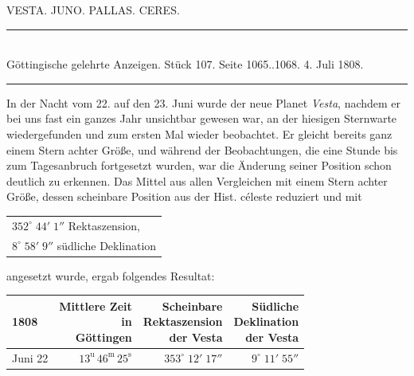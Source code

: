 \begin{center}
VESTA. JUNO. PALLAS. CERES.
\end{center}

\begin{center}
\rule{4cm}{0.4pt}\\
\fontsize{10}{12}\selectfont Göttingische gelehrte Anzeigen. Stück 107. Seite 1065..1068. 4. Juli 1808.\\
\rule{4cm}{0.4pt}
\end{center}

In der Nacht vom 22. auf den 23. Juni wurde der neue Planet \emph{Vesta}, nachdem er bei uns fast ein ganzes Jahr unsichtbar gewesen war, an der hiesigen Sternwarte wiedergefunden und zum ersten Mal wieder beobachtet. Er gleicht bereits ganz einem Stern achter Größe, und während der Beobachtungen, die eine Stunde bis zum Tagesanbruch fortgesetzt wurden, war die Änderung seiner Position schon deutlich zu erkennen. Das Mittel aus allen Vergleichen mit einem Stern achter Größe, dessen scheinbare Position aus der Hist. céleste reduziert und mit


\begin{center}\fontsize{10}{12}\selectfont\setlength{\tabcolsep}{3pt}\renewcommand{\arraystretch}{1.15}\begin{tabular}{l}
$352^\circ\;44'\;1''$ Rektaszension,\\
$8^\circ\;58'\;9''$ südliche Deklination
\end{tabular}\end{center}


\noindent angesetzt wurde, ergab folgendes Resultat:


\begin{center}\fontsize{10}{12}\selectfont\setlength{\tabcolsep}{3pt}\renewcommand{\arraystretch}{1.15}\begin{tabular}{lrrr}
1808 & \shortstack{Mittlere Zeit\\in\\Göttingen} & \shortstack{Scheinbare\\Rektaszension\\der Vesta} & \shortstack{Südliche\\Deklination\\der Vesta}\\\hline
Juni 22 & $13^{\text{u}}\,46^{\text{m}}\,25^{\text{s}}$ & $353^\circ\;12'\;17''$ & $9^\circ\;11'\;55''$\\
\end{tabular}\end{center}


